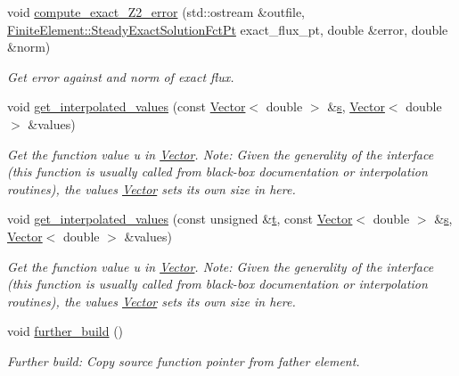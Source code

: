 \begin{DoxyCompactItemize}
void \hyperlink{classoomph_1_1RefineablePoissonEquations_aa1330f79f5a9d44aef1a6984671fe160}{compute\+\_\+exact\+\_\+\+Z2\+\_\+error} (std\+::ostream \&outfile, \hyperlink{classoomph_1_1FiniteElement_a690fd33af26cc3e84f39bba6d5a85202}{Finite\+Element\+::\+Steady\+Exact\+Solution\+Fct\+Pt} exact\+\_\+flux\+\_\+pt, double \&error, double \&norm)
\begin{DoxyCompactList}\small\item\em Get error against and norm of exact flux. \end{DoxyCompactList}\item 
void \hyperlink{classoomph_1_1RefineablePoissonEquations_a5e0651853bb43a4636168562a9ce854c}{get\+\_\+interpolated\+\_\+values} (const \hyperlink{classoomph_1_1Vector}{Vector}$<$ double $>$ \&\hyperlink{cfortran_8h_ab7123126e4885ef647dd9c6e3807a21c}{s}, \hyperlink{classoomph_1_1Vector}{Vector}$<$ double $>$ \&values)
\begin{DoxyCompactList}\small\item\em Get the function value u in \hyperlink{classoomph_1_1Vector}{Vector}. Note\+: Given the generality of the interface (this function is usually called from black-\/box documentation or interpolation routines), the values \hyperlink{classoomph_1_1Vector}{Vector} sets its own size in here. \end{DoxyCompactList}\item 
void \hyperlink{classoomph_1_1RefineablePoissonEquations_affb65cdad97b93f4eff2e2f804efac02}{get\+\_\+interpolated\+\_\+values} (const unsigned \&\hyperlink{cfortran_8h_af6f0bd3dc13317f895c91323c25c2b8f}{t}, const \hyperlink{classoomph_1_1Vector}{Vector}$<$ double $>$ \&\hyperlink{cfortran_8h_ab7123126e4885ef647dd9c6e3807a21c}{s}, \hyperlink{classoomph_1_1Vector}{Vector}$<$ double $>$ \&values)
\begin{DoxyCompactList}\small\item\em Get the function value u in \hyperlink{classoomph_1_1Vector}{Vector}. Note\+: Given the generality of the interface (this function is usually called from black-\/box documentation or interpolation routines), the values \hyperlink{classoomph_1_1Vector}{Vector} sets its own size in here. \end{DoxyCompactList}\item 
void \hyperlink{classoomph_1_1RefineablePoissonEquations_adb5a117ca7556e66af8f3eeaf0bbee7a}{further\+\_\+build} ()
\begin{DoxyCompactList}\small\item\em Further build\+: Copy source function pointer from father element. \end{DoxyCompactList}\end{DoxyCompactItemize}
